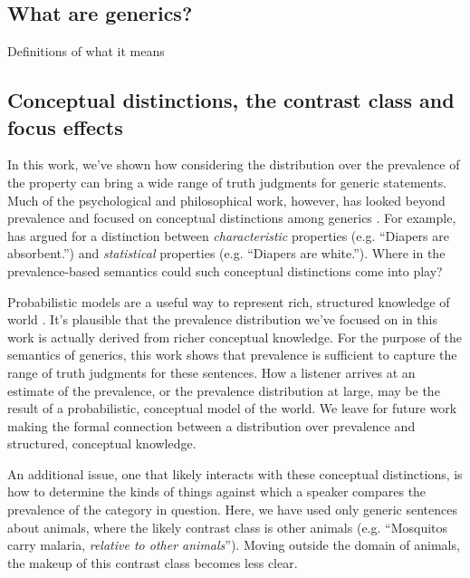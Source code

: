 \documentclass[10pt,letterpaper]{article}
\begin{document}
\subsection{What are generics?}

Definitions of what it means 


\subsection{Conceptual distinctions, the contrast class and focus effects}

In this work, we've shown how considering the distribution over the prevalence of the property can bring a wide range of truth judgments for generic statements. Much of the psychological and philosophical work, however, has looked beyond prevalence and focused on conceptual distinctions among generics \cite{Prasada2013, Leslie2007}. For example, \citeauthor{Prasada2013} has argued for a distinction between \emph{characteristic} properties (e.g. ``Diapers are absorbent.'') and \emph{statistical} properties (e.g. ``Diapers are white.''). Where in the prevalence-based semantics could such conceptual distinctions come into play?

Probabilistic models are a useful way to represent rich, structured knowledge of world \cite{Goodman2015concepts}. It's plausible that the prevalence distribution we've focused on in this work is actually derived from richer conceptual knowledge. For the purpose of the semantics of generics, this work shows that prevalence is sufficient to capture the range of truth judgments for these sentences. How a listener arrives at an estimate of the prevalence, or the prevalence distribution at large, may be the result of a probabilistic, conceptual model of the world. We leave for future work making the formal connection between a distribution over prevalence and structured, conceptual knowledge.

An additional issue, one that likely interacts with these conceptual distinctions, is how to determine the kinds of things  against which a speaker compares the prevalence of the category in question. Here, we have used only generic sentences about animals, where the likely contrast class is other animals (e.g. ``Mosquitos carry malaria, \emph{relative to other animals}''). Moving outside the domain of animals, the makeup of this contrast class becomes less clear. 
\end{document}
